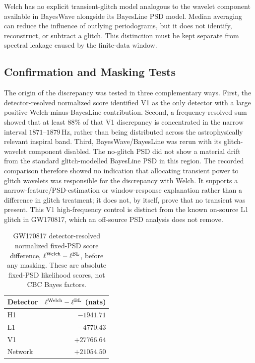 Welch has no explicit transient-glitch model analogous to the wavelet
component available in BayesWave alongside its BayesLine PSD model. Median
averaging can reduce the influence of outlying periodograms, but it does not
identify, reconstruct, or subtract a glitch. This distinction must be kept
separate from spectral leakage caused by the finite-data window.

\subsection{Confirmation and Masking Tests}

The origin of the discrepancy was tested in three complementary ways. First,
the detector-resolved normalized score identified V1 as the only detector
with a large positive Welch-minus-BayesLine contribution. Second, a
frequency-resolved sum showed that at least $88\%$ of that V1 discrepancy is
concentrated in the narrow interval $1871$--$1879\,\mathrm{Hz}$, rather than
being distributed across the astrophysically relevant inspiral band. Third,
BayesWave/BayesLine was rerun with its glitch-wavelet component disabled. The no-glitch PSD did
not show a material drift from the standard glitch-modelled BayesLine PSD in
this region. The recorded comparison therefore showed no indication that
allocating transient power to glitch wavelets was responsible for the
discrepancy with Welch. It supports a narrow-feature/PSD-estimation or
window-response explanation rather than a difference in glitch treatment;
it does not, by itself, prove that no transient was present. This V1
high-frequency control is distinct from the known on-source L1 glitch in
GW170817, which an off-source PSD analysis does not remove.

\begin{table}[ht]
\centering
\small
\caption{GW170817 detector-resolved normalized fixed-PSD score difference,
$\ell^{\rm Welch}-\ell^{\rm BL}$, before any masking. These are absolute
fixed-PSD likelihood scores, not CBC Bayes factors.}
\begin{tabular}{lr}
\toprule
\textbf{Detector} & \textbf{$\ell^{\rm Welch}-\ell^{\rm BL}$ (nats)}\\
\midrule
H1 & $-1941.71$\\
L1 & $-4770.43$\\
V1 & $+27766.64$\\
\midrule
Network & $+21054.50$\\
\bottomrule
\end{tabular}
\end{table}


